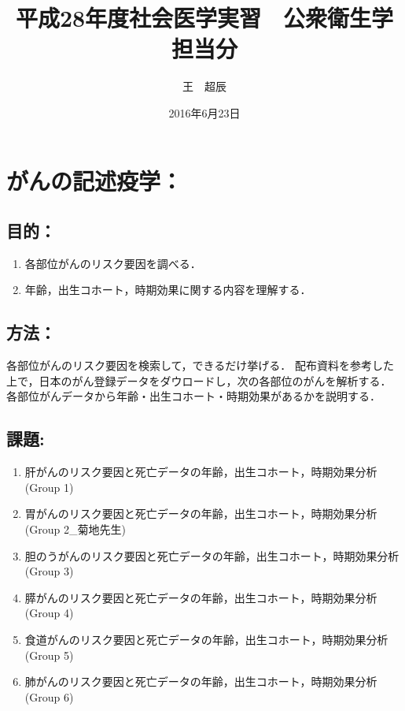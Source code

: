 \documentclass[11pt,]{article}
\title{平成28年度社会医学実習　公衆衛生学担当分}
\author{王　超辰}
\date{2016年6月23日}
\providecommand{\tightlist}{%
  \setlength{\itemsep}{0pt}\setlength{\parskip}{0pt}}
\begin{document}
\maketitle

\section{がんの記述疫学：}

\subsection{目的：}

\begin{enumerate}
\def\labelenumi{\arabic{enumi}.}
\tightlist
\item
  各部位がんのリスク要因を調べる．\\
\item
  年齢，出生コホート，時期効果に関する内容を理解する．
\end{enumerate}

\subsection{方法：}

各部位がんのリスク要因を検索して，できるだけ挙げる．
配布資料を参考した上で，日本のがん登録データをダウロードし，次の各部位のがんを解析する．
各部位がんデータから年齢・出生コホート・時期効果があるかを説明する．

\subsection{課題:}

\begin{enumerate}
\def\labelenumi{\arabic{enumi}.}
\item
  肝がんのリスク要因と死亡データの年齢，出生コホート，時期効果分析
  (Group 1)
\item
  胃がんのリスク要因と死亡データの年齢，出生コホート，時期効果分析
  (Group 2\_菊地先生)
\item
  胆のうがんのリスク要因と死亡データの年齢，出生コホート，時期効果分析
  (Group 3)
\item
  膵がんのリスク要因と死亡データの年齢，出生コホート，時期効果分析
  (Group 4)
\item
  食道がんのリスク要因と死亡データの年齢，出生コホート，時期効果分析
  (Group 5)
\item
  肺がんのリスク要因と死亡データの年齢，出生コホート，時期効果分析
  (Group 6)
\end{enumerate}
\end{document}
